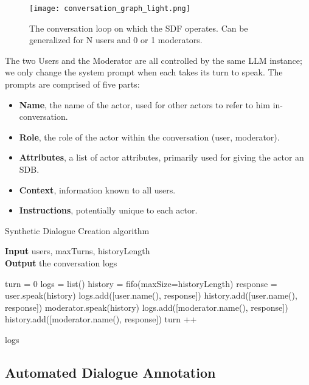 \begin{figure}
	\centering
	\texttt{[image: conversation\_graph\_light.png]}
	\caption{The conversation loop on which the \ac{SDF} operates. Can be generalized for N users and 0 or 1 moderators.}
	\label{fig::conversation}
\end{figure}

The two Users and the Moderator are all controlled by the same LLM instance; we only change the system prompt when each takes its turn to speak. The prompts are comprised of five parts:

\begin{itemize}
	\item \textbf{Name}, the name of the actor, used for other actors to refer to him in-conversation.
	\item \textbf{Role}, the role of the actor within the conversation (user, moderator).
	\item \textbf{Attributes}, a list of actor attributes, primarily used for giving the actor an \ac{SDB}.
	\item \textbf{Context}, information known to all users.
	\item \textbf{Instructions}, potentially unique to each actor. 
\end{itemize}


\begin{algorithm}
	\caption{Synthetic Dialogue Creation algorithm} 
	\label{al::dialogue-creation}
	\hspace*{\algorithmicindent} \textbf{Input} users, maxTurns, historyLength\\
	\hspace*{\algorithmicindent} \textbf{Output} the conversation logs
	\begin{algorithmic}[1]	
		\State turn = 0
		\State logs = list()
		\State history = fifo(maxSize=historyLength)
		\State 
		\State response = user.speak(history)
		\State logs.add([user.name(), response])
		\State history.add([user.name(), response])
		\State
		\State moderator.speak(history)
		\State logs.add([moderator.name(), response])
		\State history.add([moderator.name(), response])
		\EndFor
		\State turn ++
		\EndWhile
		
		\State \Return logs
		
	\end{algorithmic} 
\end{algorithm}



\subsection{Automated Dialogue Annotation}
\label{ssec:system:annotation}

